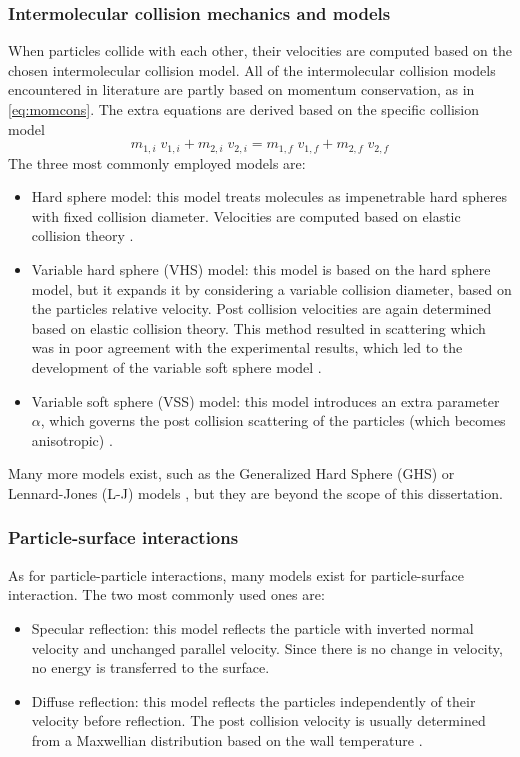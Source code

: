 \subsubsection{Intermolecular collision mechanics and models}
When particles collide with each other, their velocities are computed based on the chosen intermolecular collision model. All of the intermolecular collision models encountered in literature are partly based on momentum conservation, as in \autoref{eq:momcons}. The extra equations are derived based on the specific collision model
\begin{equation}
    m_{1,i}\; v_{1,i} + m_{2,i}\; v_{2,i} = m_{1,f}\; v_{1,f} + m_{2,f}\; v_{2,f}
    \label{eq:momcons}
\end{equation}
The three most commonly employed models are:
\begin{itemize}
    \item Hard sphere model: this model treats molecules as impenetrable hard spheres with fixed collision diameter. Velocities are computed based on elastic collision theory \cite{collisionmodels}.
    \item Variable hard sphere (VHS) model: this model is based on the hard sphere model, but it expands it by considering a variable collision diameter, based on the particles relative velocity. Post collision velocities are again determined based on elastic collision theory. This method resulted in scattering which was in poor agreement with the experimental results, which led to the development of the variable soft sphere model \cite{collisionmodels}.
    \item Variable soft sphere (VSS) model: this model introduces an extra parameter $\alpha$, which governs the post collision scattering of the particles (which becomes anisotropic) \cite{collisionmodels}.
\end{itemize}

Many more models exist, such as the Generalized Hard Sphere (GHS) or Lennard-Jones (L-J) models \cite{collisionmodels}, but they are beyond the scope of this dissertation.

\subsubsection{Particle-surface interactions}
\label{subsection:partsurf}
As for particle-particle interactions, many models exist for particle-surface interaction. The two most commonly used ones are:
\begin{itemize}
    \item Specular reflection: this model reflects the particle with inverted normal velocity and unchanged parallel velocity. Since there is no change in velocity, no energy is transferred to the surface.
    \item Diffuse reflection: this model reflects the particles independently of their velocity before reflection. The post collision velocity is usually determined from a Maxwellian distribution based on the wall temperature \cite{bird, spartadoc}.
\end{itemize}

